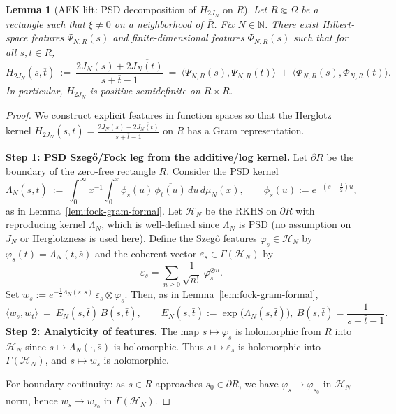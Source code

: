\documentclass[11pt]{article}
\newtheorem{lemma}[theorem]{Lemma}
\theoremstyle{remark}
\begin{document}
\begin{lemma}[AFK lift: PSD decomposition of \(H_{2J_N}\) on \(R\)]\label{lem:AFK}
Let \(R\Subset\Omega\) be a rectangle such that \(\xi\neq 0\) on a neighborhood of \(\overline R\). Fix \(N\in\mathbb N\). There exist Hilbert-space features \(\Psi_{N,R}(s)\) and finite-dimensional features \(\Phi_{N,R}(s)\) such that for all \(s,t\in R\),
\[
 H_{2J_N}(s,\overline t)\ :=\ \frac{2J_N(s)+2\overline{J_N(t)}}{s+\overline t-1}\ =\ \big\langle\Psi_{N,R}(s),\Psi_{N,R}(t)\big\rangle\ +\ \big\langle\Phi_{N,R}(s),\Phi_{N,R}(t)\big\rangle.
\]
In particular, \(H_{2J_N}\) is positive semidefinite on \(R\times R\).
\end{lemma}
\begin{proof}
We construct explicit features in function spaces so that the Herglotz kernel
$H_{2J_N}(s,\bar t) = \frac{2J_N(s) + 2\overline{J_N(t)}}{s + \bar t - 1}$
on $R$ has a Gram representation.

\medskip
\noindent\textbf{Step 1: PSD Szegő/Fock leg from the additive/log kernel.}
Let $\partial R$ be the boundary of the zero-free rectangle $R$. Consider the PSD kernel
\[
  \Lambda_N(s,\bar t)\ :=\ \int_0^\infty x^{-1}\int_0^x \phi_s(u)\,\overline{\phi_t(u)}\,du\,d\mu_N(x),\qquad \phi_s(u):=e^{-(s-\frac12)u},
\]
as in Lemma~\ref{lem:fock-gram-formal}. Let $\mathcal H_N$ be the RKHS on $\partial R$ with reproducing kernel $\Lambda_N$, which is well-defined since $\Lambda_N$ is PSD (no assumption on $J_N$ or Herglotzness is used here). Define the Szegő features $\varphi_s\in\mathcal H_N$ by $\varphi_s(t)=\Lambda_N(t,\bar s)$ and the coherent vector $\varepsilon_s\in\Gamma(\mathcal H_N)$ by
\[
  \varepsilon_s=\sum_{n\ge 0}\frac{1}{\sqrt{n!}}\,\varphi_s^{\otimes n}.
\]
Set $w_s:=e^{-\tfrac12\Lambda_N(s,\bar s)}\,\varepsilon_s\otimes\varphi_s$. Then, as in Lemma~\ref{lem:fock-gram-formal},
\[
  \langle w_s,w_t\rangle\ =\ E_N(s,\bar t)\,B(s,\bar t),\qquad E_N(s,\bar t):=\exp\big(\Lambda_N(s,\bar t)\big),\ B(s,\bar t)=\frac{1}{s+\bar t-1}.
\]
\medskip
\noindent\textbf{Step 2: Analyticity of features.}
The map $s \mapsto \varphi_s$ is holomorphic from $R$ into $\mathcal{H}_N$ since $s \mapsto \Lambda_N(\cdot, \bar s)$ is holomorphic. Thus $s \mapsto \varepsilon_s$ is holomorphic into $\Gamma(\mathcal{H}_N)$, and $s \mapsto w_s$ is holomorphic.

For boundary continuity: as $s \in R$ approaches $s_0 \in \partial R$, we have $\varphi_s \to \varphi_{s_0}$ in $\mathcal{H}_N$ norm, hence $w_s \to w_{s_0}$ in $\Gamma(\mathcal{H}_N)$.


\end{proof}
\end{document}
